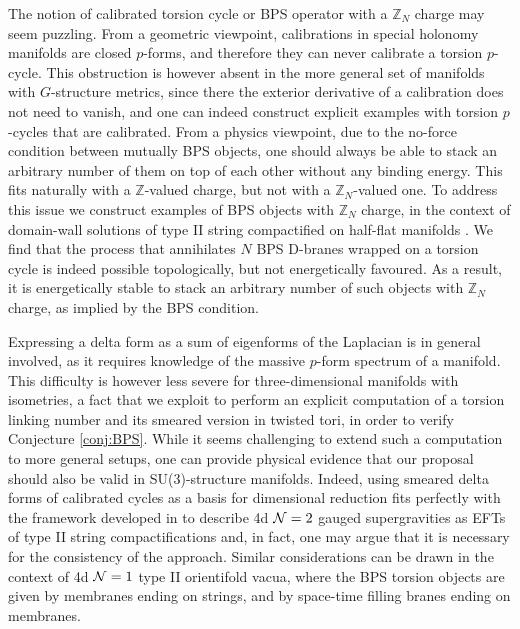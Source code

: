 \documentclass[11pt]{article}
\def\CN {{\cal N}}
\newcommand{\IZ}{\mathbb{Z}}
\begin{document}
The notion of calibrated torsion cycle or BPS operator with a $\IZ_N$ charge may seem puzzling. From a geometric viewpoint, calibrations in special 
holonomy manifolds are closed $p$-forms, and therefore they can never calibrate a torsion $p$-cycle. This obstruction is however absent in the more general set of manifolds with $G$-structure metrics, since there the exterior derivative of a calibration does not need to vanish, and one can indeed construct explicit examples with torsion $p$-cycles that are calibrated. From a physics viewpoint, due to the no-force condition between mutually BPS objects, one should always be able to stack an arbitrary number of them on top of each other without any binding energy. This fits naturally with a $\IZ$-valued charge, but not with a $\IZ_N$-valued one. To address this issue we construct examples of BPS objects with $\IZ_N$ charge, in the context of domain-wall solutions of type II string compactified on half-flat manifolds \cite{Gurrieri:2002wz}. We find that the process that annihilates $N$ BPS D-branes wrapped on a torsion cycle is indeed possible topologically, but not energetically favoured. As a result, it is energetically stable to stack an arbitrary number of such objects with $\IZ_N$ charge, as implied by the BPS condition. 

Expressing a delta form as a sum of eigenforms of the Laplacian is in general involved, as it requires knowledge of the massive $p$-form spectrum of a manifold. This difficulty is however less severe for three-dimensional  manifolds with isometries, a fact that we exploit to perform an explicit computation of a torsion linking number and its smeared version in twisted tori, in order to verify Conjecture \ref{conj:BPS}. While it seems challenging to extend such a computation to more general setups, one can provide physical evidence that our proposal should also be valid in SU(3)-structure manifolds. Indeed, using smeared delta forms of calibrated cycles as a basis for dimensional reduction fits perfectly with the framework developed in \cite{DAuria:2004kwe,Grana:2005ny,Kashani-Poor:2006ofe} to describe 4d $\CN=2$ gauged supergravities as EFTs of type II string compactifications and, in fact, one may argue that it is necessary for the consistency of the approach. Similar considerations can be drawn in the context of 4d $\CN=1$ type II orientifold vacua, where the BPS torsion objects are given by membranes ending on strings, and by space-time filling branes ending on membranes. 
\end{document}
